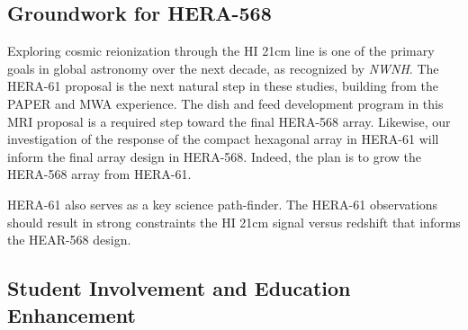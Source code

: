 \documentclass[preprint]{aastex}
\def\nwnh{{\sl NWNH}}
\begin{document}

\subsection{Groundwork for HERA-568}
\vspace{-6pt}

Exploring cosmic reionization through the HI 21cm line is one of the primary goals in global astronomy
over the next decade, as recognized by \nwnh. The HERA-61 proposal is the next natural step in these
studies, building from the PAPER and MWA experience. The dish and feed development program in this MRI proposal
is a required step toward the final HERA-568 array.  Likewise, our investigation of the response of the
compact  hexagonal array in HERA-61 will inform the final array design in HERA-568. Indeed, the plan
is to grow the HERA-568 array from HERA-61.

HERA-61 also serves as a key science path-finder. The HERA-61 observations should result in strong constraints 
the HI 21cm signal versus redshift that informs the HEAR-568 design.  

\vspace{-0.25in}
\subsection{Student Involvement and Education Enhancement}
\vspace{-6pt}


\end{document}
